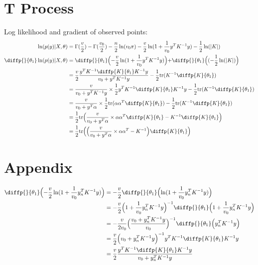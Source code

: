 \documentclass[]{article}
\begin{document}
\section{T Process}
Log likelihood and gradient of observed points:
\begin{equation}
	\begin{aligned}
		\ln(p(y) | X, \theta) &= \Gamma(\frac{v}{2}) - \Gamma(\frac{v_0}{2}) - \frac{n}{2}\ln(v_0\pi) - \frac{v}{2}\ln(1+\frac{1}{v_0}y^T K^{-1} y) - \frac{1}{2}\ln(|K|)\\
		\diffp{}{{\theta_1}}\ln(p(y) | X, \theta) &= \diffp{}{{\theta_1}} \Bigl( - \frac{v}{2}\ln(1+\frac{1}{v_0}y^T K^{-1} y) \Bigl) + \diffp{}{{\theta_1}} \Bigl((-\frac{1}{2}\ln(|K|)\Bigl) \\
		&= \frac{v}{2} \frac{y^TK^{-1} \diffp{K}{{\theta_1}} K^{-1} y}{v_0+y^T K^{-1} y} - \frac{1}{2}\text{tr}(K^{-1} \diffp{K}{{\theta_1}})\\
		&= \frac{v}{v_0+y^T K^{-1} y} \times \frac{1}{2} y^TK^{-1} \diffp{K}{{\theta_1}} K^{-1} y - \frac{1}{2}\text{tr}(K^{-1} \diffp{K}{{\theta_1}})\\
		&= \frac{v}{v_0 + y^T\alpha}\times\frac{1}{2} \text{tr}(\alpha\alpha^T \diffp{K}{{\theta_1}}) - \frac{1}{2}\text{tr}(K^{-1} \diffp{K}{{\theta_1}})\\
		&= \frac{1}{2}\text{tr}\Bigl(\frac{v}{v_0 + y^T\alpha} \times \alpha\alpha^T \diffp{K}{{\theta_1}} -  K^{-1} \diffp{K}{{\theta_1}}\Bigl)\\
		&= \frac{1}{2}\text{tr}\Bigl(\Bigl(\frac{v}{v_0 + y^T\alpha} \times \alpha\alpha^T - K^{-1} \Bigl) \diffp{K}{{\theta_1}} \Bigl)
	\end{aligned}
\end{equation}

\section{Appendix}
\begin{equation}
	\begin{aligned}
		\diffp{}{{\theta_1}} \Bigl( - \frac{v}{2}\ln(1+\frac{1}{v_0}y^T_n K^{-1} y) \Bigl) 
		&= - \frac{v}{2} \diffp{}{{\theta_1}} \Bigl( \ln(1+\frac{1}{v_0}y^T_n K^{-1} y) \Bigl)\\
		&= - \frac{v}{2} \Bigl(1+\frac{1}{v_0}y^T_n K^{-1} y\Bigl)^{-1}  \diffp{}{{\theta_1}} \Bigl( 1+\frac{1}{v_0}y^T_n K^{-1} y \Bigl)\\
		&= - \frac{v}{2v_0} \Bigl(\frac{v_0 + y^T_n K^{-1} y}{v_0} \Bigl)^{-1} \diffp{}{{\theta_1}}\Bigl(y^T_n K^{-1} y \Bigl)\\
		&= \frac{v}{2} \Bigl(v_0 + y^T_n K^{-1} y \Bigl)^{-1}  y^TK^{-1} \diffp{K}{{\theta_1}} K^{-1} y\\
		&= \frac{v}{2} \frac{y^TK^{-1} \diffp{K}{{\theta_1}} K^{-1} y}{v_0+y^T_n K^{-1} y}\\		
	\end{aligned}
\end{equation}
\end{document}
